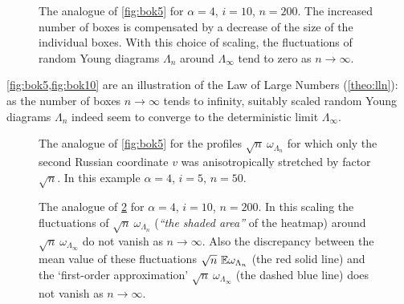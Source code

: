 \documentclass[12pt,usenames,dvipsnames,svgnames,table]{amsart}
\begin{document}
\begin{figure}
	\centering
	
	\caption{Diagonal gray lines form a 
		\emph{heatmap} showing probabilities that a given segment belongs to the profile
		of the random Young diagram $\Lambda_n$ (the intensity of color corresponds to
		the probability). 
		The rectangular grid of anisotropically stretched boxes is clearly visible.
		The blue dashed line depicts the limit profile $\omega_{\Lambda_\infty}$.
		In order to save space, only the neighborhood of $\Lambda_\infty$ is shown.
		The red solid line depicts the mean value $t\mapsto \E \omega_{\Lambda_n}(t)$.
		In this example $\alpha=4$, $i=5$, $n=50$.}
	\label{fig:bok5}
	
	\bigskip
	
	\centering
	
	\caption{The analogue of \cref{fig:bok5} for $\alpha=4$, $i=10$, $n=200$.
		The increased number of boxes is compensated by a decrease of the size of the individual boxes.
		With this choice of scaling, the fluctuations of random Young diagrams $\Lambda_n$ around $\Lambda_\infty$
		tend to zero as $n\to\infty$.}
	\label{fig:bok10}
\end{figure}

\cref{fig:bok5,fig:bok10} are an illustration of the Law of Large Numbers
(\cref{theo:lln}): as the number of boxes $n\to\infty$ tends to infinity,
suitably scaled random Young diagrams $\Lambda_n$ indeed seem to converge
to the deterministic limit $\Lambda_\infty$.

\begin{figure}
	\centering
	
	\caption{The analogue of \cref{fig:bok5} for the profiles
		$\sqrt{n}\ \omega_{\Lambda_n}$ for which only the second Russian coordinate $v$
		was anisotropically stretched by factor $\sqrt{n}$.
		In this example $\alpha=4$, $i=5$, $n=50$.}
	\label{fig:anizo5}
	
\end{figure}

\begin{figure}
	\centering
	
	\caption{
		The analogue of \cref{fig:anizo5}
		for $\alpha=4$, $i=10$, $n=200$.
		In this scaling the fluctuations of $\sqrt{n}\ \omega_{\Lambda_n}$ 
		(\emph{``the shaded area''} of the heatmap)
		around $\sqrt{n}\ \omega_{\Lambda_\infty}$ do not vanish as $n\to\infty$.
		Also the discrepancy between the mean value of these fluctuations 
		$\sqrt{n}\ \mathbb{E} \omega_{\Lambda_n}$ (the red solid line)
		and the `first-order approximation' $\sqrt{n}\ \omega_{\Lambda_\infty}$
		(the dashed blue line)
		does not vanish as $n\to\infty$. 
	}
\end{figure}
\end{document}
